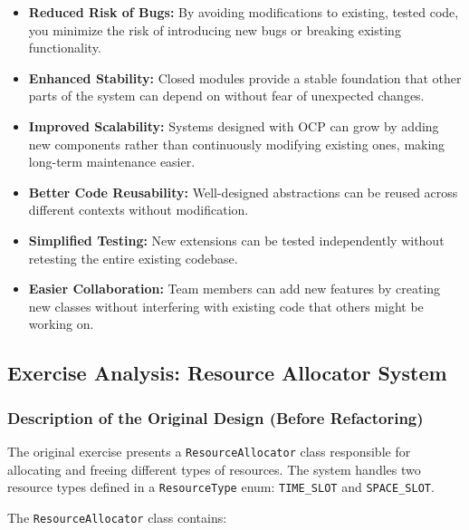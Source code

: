 \begin{itemize}
    \item \textbf{Reduced Risk of Bugs:} By avoiding modifications to existing, tested code, you minimize the risk of introducing new bugs or breaking existing functionality.
    
    \item \textbf{Enhanced Stability:} Closed modules provide a stable foundation that other parts of the system can depend on without fear of unexpected changes.
    
    \item \textbf{Improved Scalability:} Systems designed with OCP can grow by adding new components rather than continuously modifying existing ones, making long-term maintenance easier.
    
    \item \textbf{Better Code Reusability:} Well-designed abstractions can be reused across different contexts without modification.
    
    \item \textbf{Simplified Testing:} New extensions can be tested independently without retesting the entire existing codebase.
    
    \item \textbf{Easier Collaboration:} Team members can add new features by creating new classes without interfering with existing code that others might be working on.
\end{itemize}

\subsection{Exercise Analysis: Resource Allocator System}

\subsubsection{Description of the Original Design (Before Refactoring)}

The original exercise presents a \texttt{ResourceAllocator} class responsible for allocating and freeing different types of resources. The system handles two resource types defined in a \texttt{ResourceType} enum: \texttt{TIME\_SLOT} and \texttt{SPACE\_SLOT}.

The \texttt{ResourceAllocator} class contains:

